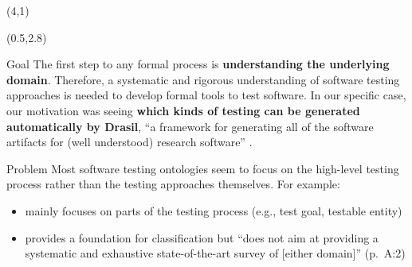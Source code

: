 \documentclass[22pt]{beamer}
\begin{document}
\begin{frame}[fragile]
    \begin{textblock}{8}(4,1)
        \titlepage
    \end{textblock}

    \begin{textblock}{7.25}(0.5,2.8)

        \begin{block}{\fontsize{37}{20}\selectfont Goal}
            The first step to any formal process is \textbf{understanding the
                underlying domain}. Therefore, a systematic and rigorous
            understanding of software testing approaches is needed to develop formal
            tools to test software. In our specific case, our motivation was seeing
            \textbf{which kinds of testing can be generated automatically by Drasil},
            ``a framework for generating all of the software artifacts for
            (well understood) research software'' \cite{carette_drasil_2021}.
            \vspace{5mm}
        \end{block}

        \begin{block}{\fontsize{37}{20}\selectfont Problem}
            Most software testing ontologies seem to focus on the high-level
            testing process rather than the testing approaches themselves. For
            example:
            \begin{itemize}
                \item \cite{TebesEtAl2020a} mainly focuses on parts of the
                      testing process (e.g., test goal, testable entity)
                \item \cite{UnterkalmsteinerEtAl2014} provides a foundation for
                      classification but ``does not aim at providing a systematic
                      and exhaustive state-of-the-art survey of [either domain]''
                      (p.~A:2)
            \end{itemize}
            \vspace{5mm}
        \end{block}


\end{textblock}
\end{frame}
\end{document}
